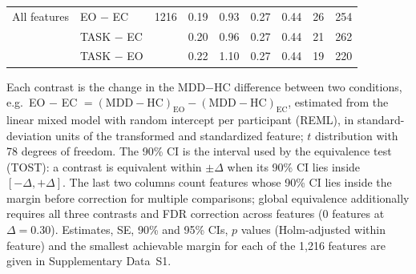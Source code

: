 \begin{table}[!t]
\begin{tabular}{llccccccc}
\midrule
All features & EO $-$ EC & 1216 & 0.19 & 0.93 & 0.27 & 0.44 & 26 & 254 \\
 & TASK $-$ EC &  & 0.20 & 0.96 & 0.27 & 0.44 & 21 & 262 \\
 & TASK $-$ EO &  & 0.22 & 1.10 & 0.27 & 0.44 & 19 & 220 \\
\bottomrule
\end{tabular}
\par\vspace{2pt}
\begin{minipage}{\textwidth}
\scriptsize
Each contrast is the change in the MDD$-$HC difference between two conditions, e.g.\ EO $-$ EC $= (\mathrm{MDD}-\mathrm{HC})_{\mathrm{EO}} - (\mathrm{MDD}-\mathrm{HC})_{\mathrm{EC}}$, estimated from the linear mixed model with random intercept per participant (REML), in standard-deviation units of the transformed and standardized feature; $t$ distribution with 78 degrees of freedom. The 90\% CI is the interval used by the equivalence test (TOST): a contrast is equivalent within $\pm\Delta$ when its 90\% CI lies inside $[-\Delta, +\Delta]$. The last two columns count features whose 90\% CI lies inside the margin before correction for multiple comparisons; global equivalence additionally requires all three contrasts and FDR correction across features (0 features at $\Delta = 0.30$). Estimates, SE, 90\% and 95\% CIs, $p$ values (Holm-adjusted within feature) and the smallest achievable margin for each of the 1,216 features are given in Supplementary Data~S1.
\end{minipage}
\end{table}